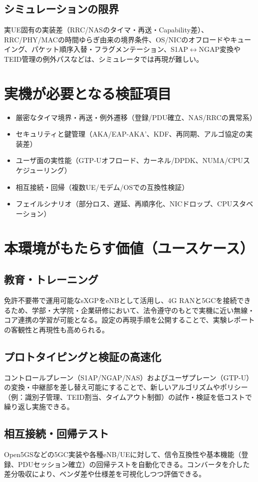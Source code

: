 \subsection{シミュレーションの限界}
実UE固有の実装差（RRC/NASのタイマ・再送・Capability差）、RRC/PHY/MACの時間ゆらぎ由来の境界条件、OS/NICのオフロードやキューイング、パケット順序入替・フラグメンテーション、S1AP$\leftrightarrow$NGAP変換やTEID管理の例外パスなどは、シミュレータでは再現が難しい。

\section{実機が必要となる検証項目}
\begin{itemize}
	\item 厳密なタイマ境界・再送・例外遷移（登録/PDU確立、NAS/RRCの異常系）
	\item セキュリティと鍵管理（AKA/EAP-AKA'、KDF、再同期、アルゴ協定の実装差）
	\item ユーザ面の実性能（GTP-Uオフロード、カーネル/DPDK、NUMA/CPUスケジューリング）
	\item 相互接続・回帰（複数UE/モデム/OSでの互換性検証）
	\item フェイルシナリオ（部分ロス、遅延、再順序化、NICドロップ、CPUスタベーション）
\end{itemize}

\section{本環境がもたらす価値（ユースケース）}
\label{sec:values}
\subsection{教育・トレーニング}
免許不要帯で運用可能なsXGPをeNBとして活用し、4G RANと5GCを接続できるため、学部・大学院・企業研修において、法令遵守のもとで実機に近い無線・コア連携の学習が可能となる。設定の再現手順を公開することで、実験レポートの客観性と再現性も高められる。

\subsection{プロトタイピングと検証の高速化}
コントロールプレーン（S1AP/NGAP/NAS）およびユーザプレーン（GTP-U）の変換・中継部を差し替え可能にすることで、新しいアルゴリズムやポリシー（例：識別子管理、TEID割当、タイムアウト制御）の試作・検証を低コストで繰り返し実施できる。

\subsection{相互接続・回帰テスト}
Open5GSなどの5GC実装や各種eNB/UEに対して、信令互換性や基本機能（登録、PDUセッション確立）の回帰テストを自動化できる。コンバータを介した差分吸収により、ベンダ差や仕様差を可視化しつつ評価できる。

